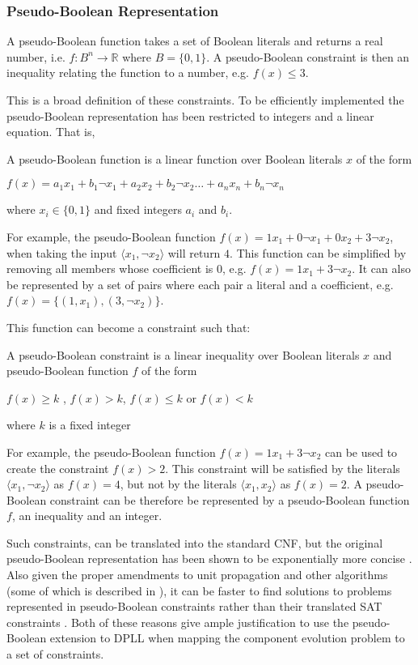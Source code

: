 \subsubsection{Pseudo-Boolean Representation}
A pseudo-Boolean function takes a set of Boolean literals and returns a real number, i.e. $f:B^n \rightarrow \mathbb{R}$ where $B = \{0,1\}$.
A pseudo-Boolean constraint is then an inequality relating the function to a number, e.g. $f(x) \leq 3$.

This is a broad definition of these constraints.
To be efficiently implemented the pseudo-Boolean representation has been restricted to integers and a linear equation.
That is,
\begin{defs}
A pseudo-Boolean function is a linear function over Boolean literals $x$ of the form

$f(x) = a_1x_1 + b_1\neg x_1 + a_2x_2 + b_2\neg x_2 \ldots +  a_nx_n + b_n\neg x_n$

where $x_i \in \{0,1\}$ and fixed integers $a_i$ and $b_i$.
\end{defs}
For example, the pseudo-Boolean function $f(x) = 1x_1 + 0\neg x_1 + 0x_2 + 3\neg x_2$, when taking the input $\langle x_1, \neg x_2 \rangle$ will return $4$.
This function can be simplified by removing all members whose coefficient is $0$, e.g. $f(x) = 1x_1 + 3\neg x_2$.
It can also be represented by a set of pairs where each pair a literal and a coefficient, e.g. $f(x) = \{ (1,x_1), (3,\neg x_2) \}$.

This function can become a constraint such that:
\begin{defs}
A pseudo-Boolean constraint is a linear inequality over Boolean literals $x$ and pseudo-Boolean function $f$ of the form

$f(x) \geq k$ , $f(x) > k$, $f(x) \leq k$ or $f(x) < k$

where $k$ is a fixed integer
\end{defs}

For example, the pseudo-Boolean function $f(x) = 1x_1 + 3\neg x_2$ can be used to create the constraint $f(x) > 2$.
This constraint will be satisfied by the literals $\langle x_1, \neg x_2 \rangle$ as $f(x) = 4$, but not by the literals $\langle x_1,  x_2 \rangle$ as $f(x) = 2$.
A pseudo-Boolean constraint can be therefore be represented by a pseudo-Boolean function $f$, an inequality and an integer.

Such constraints, can be translated into the standard CNF, but the original pseudo-Boolean representation has been shown to be exponentially more concise \citep{dixon2004automating}.
Also given the proper amendments to unit propagation and other algorithms (some of which is described in \cite{Sheini2006}), 
it can be faster to find solutions to problems represented in pseudo-Boolean constraints rather than their translated SAT constraints \citep{dixon2004automating}.
Both of these reasons give ample justification to use the pseudo-Boolean extension to DPLL when mapping the component evolution problem to a set of constraints. 

